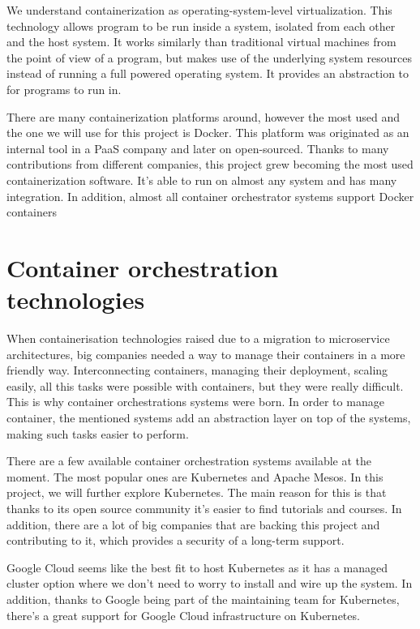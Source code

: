 We understand containerization as operating-system-level virtualization. This technology allows program to be run inside a system, isolated  from each other and the host system. It works similarly than traditional virtual machines from the point of view of a program, but makes use of the underlying system resources instead of running a full powered operating system. It provides an abstraction to for programs to run in. 
 
There are many containerization platforms around, however the most used and the one we will use for this project is Docker. This platform was originated as an internal tool in a PaaS company and later on open-sourced. Thanks to many contributions from different companies, this project grew becoming the most used containerization software. It’s able to run on almost any system and has many integration. In addition, almost all container orchestrator systems support Docker containers


\section{Container orchestration technologies}

When containerisation technologies raised due to a migration to microservice architectures, big companies needed a way to manage their containers in a more friendly way. Interconnecting containers, managing their deployment, scaling easily, all this tasks were possible with containers, but they were really difficult. This is why container orchestrations systems were born. In order to manage container, the mentioned systems add an abstraction layer on top of the systems, making such tasks easier to perform.
 
There are a few available container orchestration systems available at the moment. The most popular ones are Kubernetes and Apache Mesos. In this project, we will further explore Kubernetes. The main reason for this is that thanks to its open source community it’s easier to find tutorials and courses. In addition, there are a lot of big companies that are backing this project and contributing to it, which provides a security of a long-term support.
 
Google Cloud seems like the best fit to host Kubernetes as it has a managed cluster option where we don’t need to worry to install and wire up the system. In addition, thanks to Google being part of the maintaining team for Kubernetes, there’s a great support for Google Cloud infrastructure on Kubernetes.



